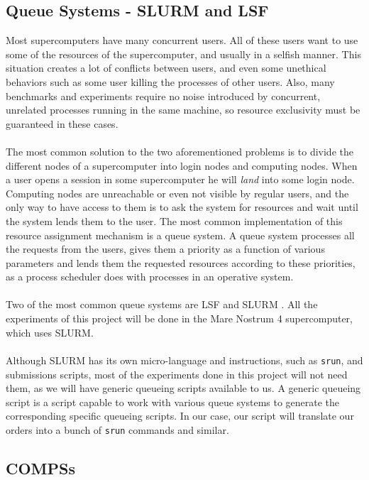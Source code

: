 \subsection{Queue Systems - SLURM and LSF}
\label{subsec:hpc_queues}
Most supercomputers have many concurrent users. All of these users want to use some of the resources of the supercomputer, and usually in a selfish manner. This situation creates a lot of conflicts between users, and even some unethical behaviors such as some user killing the processes of other users. Also, many benchmarks and experiments require no noise introduced by concurrent, unrelated processes running in the same machine, so resource exclusivity must be guaranteed in these cases.\\
\\
The most common solution to the two aforementioned problems is to divide the different nodes of a supercomputer into login nodes and computing nodes. When a user opens a session in some supercomputer he will \textit{land} into some login node. Computing nodes are unreachable or even not visible by regular users, and the only way to have access to them is to ask the system for resources and wait until the system lends them to the user. The most common implementation of this resource assignment mechanism is a queue system. A queue system processes all the requests from the users, gives them a priority as a function of various parameters and lends them the requested resources according to these priorities, as a process scheduler does with processes in an operative system.\\
\\
Two of the most common queue systems are LSF \cite{zhou1992lsf} and SLURM \cite{yoo2003slurm}. All the experiments of this project will be done in the Mare Nostrum 4 supercomputer, which uses SLURM.\\
\\
Although SLURM has its own micro-language and instructions, such as \verb|srun|, and submissions scripts, most of the experiments done in this project will not need them, as we will have generic queueing scripts available to us. A generic queueing script is a script capable to work with various queue systems to generate the corresponding specific queueing scripts. In our case, our script will translate our orders into a bunch of \verb|srun| commands and similar.\\
\newpage
\subsection{COMPSs}
\label{subsec:compss_state_of_the_art}



